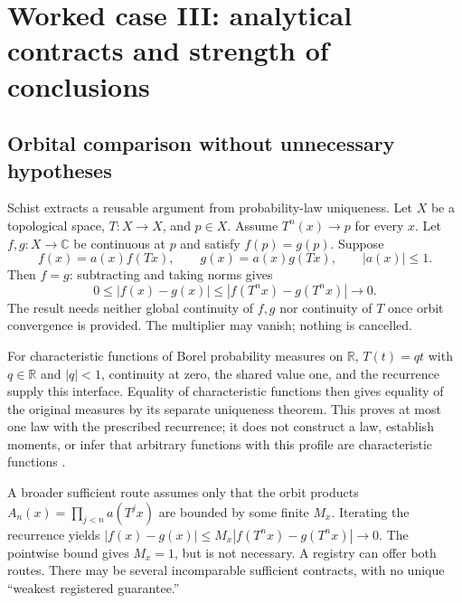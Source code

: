 \documentclass[11pt,letterpaper]{article}
\newcommand{\R}{\mathbb R}\newcommand{\Q}{\mathbb Q}
\theoremstyle{definition}\newtheorem{definition}[proposition]{Definition}
\theoremstyle{remark}\newtheorem{remark}[proposition]{Remark}
\begin{document}
\section{Worked case III: analytical contracts and strength of conclusions}\label{sec:analysis}

\subsection{Orbital comparison without unnecessary hypotheses}
Schist extracts a reusable argument from probability-law uniqueness. Let $X$
be a topological space, $T:X\to X$, and $p\in X$. Assume $T^n(x)\to p$ for
every $x$. Let $f,g:X\to\mathbb C$ be continuous at $p$ and satisfy
$f(p)=g(p)$. Suppose
\[
 f(x)=a(x)f(Tx),\qquad g(x)=a(x)g(Tx),\qquad |a(x)|\le1.
\]
Then $f=g$: subtracting and taking norms gives
\[
 0\le |f(x)-g(x)|\le |f(T^n x)-g(T^n x)|\longrightarrow0.
\]
The result needs neither global continuity of $f,g$ nor continuity of $T$ once
orbit convergence is provided. The multiplier may vanish; nothing is cancelled.

For characteristic functions of Borel probability measures on $\R$,
$T(t)=qt$ with $q\in\R$ and $|q|<1$,
continuity at zero, the shared value one, and the recurrence supply this
interface. Equality of characteristic functions then gives equality of the
original measures by its separate uniqueness theorem. This proves at most
one law with the prescribed recurrence; it does not construct a law, establish
moments, or infer that arbitrary functions with this profile are characteristic
functions \cite{schist}.

A broader sufficient route assumes only that the orbit products
$A_n(x)=\prod_{j<n}a(T^j x)$ are bounded by some finite $M_x$. Iterating the
recurrence yields
$|f(x)-g(x)|\le M_x|f(T^n x)-g(T^n x)|\to0$.
The pointwise bound gives $M_x=1$, but is not necessary. A registry can offer
both routes. There may be several incomparable sufficient contracts, with no
unique ``weakest registered guarantee.''
\end{document}
